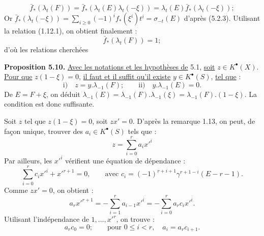 
\[
  \bar f_*(\lambda_t(F))=
  \bar f_*(\lambda_t(E)\lambda_t(-\xi))=
  \lambda_t(E)\bar f_*(\lambda_t(-\xi));
\]
Or $\bar f_*(\lambda_t(-\xi))=\sum_{i\ge0}(-1)^if_*(\xi^i)t^i=\sigma_{-t}(E)$ d'après (5.2.3).
Utilisant la relation (1.12.1), on obtient finalement :
\[
  \bar f_*(\lambda_t(F))=1;
\]
d'où les relations cherchées

\textbf{Proposition 5.10.} \uline{Avec les notations et les hypothèses de} 5.1, \uline{soit} $z\in K^{\bullet}(X)$. \uline{Pour que} $z(1-\xi)=0$, \uline{il faut et il suffit qu'il existe} $y\in K^{\bullet}(S)$, \uline{tel que} :
\[
  \text{i)}\quad z=y.\lambda_{-1}(F);
  \qquad
  \text{ii)}\quad y.\lambda_{-1}(E)=0.
\]
De $E=F+\xi$, on déduit $\lambda_{-1}(E)=\lambda_{-1}(F).\lambda_{-1}(\xi)=\lambda_{-1}(F).(1-\xi)$. La condition est donc suffisante.

Soit $z$ tel que $z(1-\xi)=0$, soit $zx'=0$. D'après la remarque 1.13, on peut, de façon unique, trouver des $a_i\in K^{\bullet}(S)$ tels que :
\[
  z=\sum_{i=0}^{r}a_i{x'}^i
\]
Par ailleurs, les ${x'}^i$ vérifient une équation de dépendance :
\[
  \sum_{i=0}^{r}c_i{x'}^i+{x'}^{r+1}=0,
  \qquad \text{avec } c_i=(-1)^{r+i+1}\gamma^{r+1-i}(E-r-1).
\]
Comme $zx'=0$, on obtient :
\[
  a_r{x'}^{r+1}=-\sum_{i=1}^{r}a_{i-1}{x'}^i
  =-\sum_{i=0}^{r}a_rc_i{x'}^i .
\]
Utilisant l'indépendance de $1,\ldots,{x'}^r$, on trouve :
\[
  a_rc_0=0;
  \qquad \text{pour } 0\le i<r,
  \quad a_i=a_rc_{i+1}.
\]
